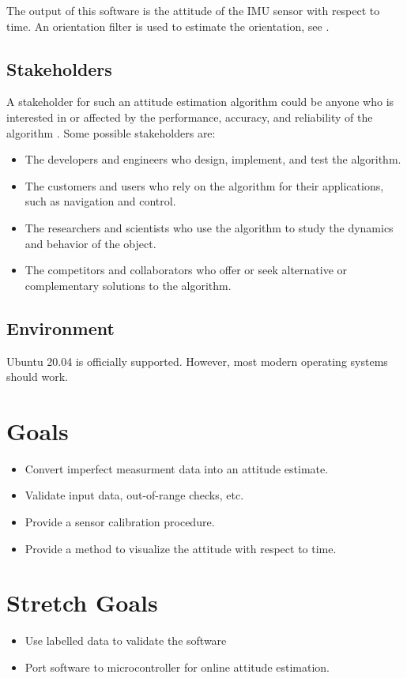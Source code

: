 \documentclass{article}
\begin{document}
The output of this software is the attitude of the IMU sensor with respect to time. An orientation filter is used to estimate the orientation, see \cite{al-jlailaty_efficient_2020}.


\subsection{Stakeholders}

A stakeholder for such an attitude estimation algorithm could be anyone who is interested in or
affected by the performance, accuracy, and reliability of the algorithm \cite{stake}. Some possible
stakeholders are:

\begin{itemize}
    \item The developers and engineers who design, implement, and test the algorithm.
    \item The customers and users who rely on the algorithm for their applications, such as
    navigation and control.
    \item The researchers and scientists who use the algorithm to study the dynamics and behavior of
    the object.
    \item The competitors and collaborators who offer or seek alternative or complementary solutions
    to the algorithm.
\end{itemize}


\subsection{Environment}

Ubuntu 20.04 is officially supported. However, most modern operating systems should work.

\section{Goals}

\begin{itemize}
    \item Convert imperfect measurment data into an attitude estimate.
    \item Validate input data, out-of-range checks, etc.
    \item Provide a sensor calibration procedure.
    \item Provide a method to visualize the attitude with respect to time.
\end{itemize}

\section{Stretch Goals}

\begin{itemize}
    \item Use labelled data to validate the software
    \item Port software to microcontroller for online attitude estimation.
\end{itemize}

{}

\end{document}
